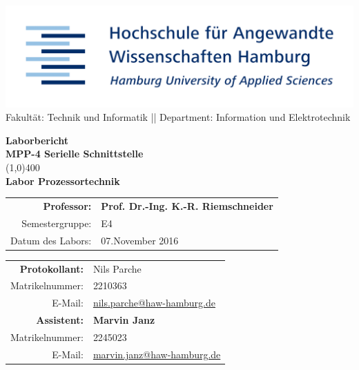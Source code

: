 	\begin{titlepage}
		\begin{flushright}
			\includegraphics[scale=0.08]{haw_logo_hd.png}\\
			{\tiny{Fakultät: Technik und Informatik || Department: Information und Elektrotechnik}}\\
			[2.5cm]
		\end{flushright}
		\begin{center}
			{\huge{\bfseries Laborbericht}}	\\
			[1.5cm]
			{\Large{\bfseries  MPP-4 Serielle Schnittstelle}}\\		
			\line(1,0){400}	\\
			[0,1cm]
			{\Large{\bfseries Labor Prozessortechnik}}	\\
			[1.5cm]
			\begin{table}[h]
				\begin{center}
					\begin{tabular}{r l}
						\small \textbf{Professor:}	&	\small \textbf{Prof. Dr.-Ing. K.-R. Riemschneider}\\[0.20cm]
						\small Semestergruppe:		&	\small E4			\\
						\small Datum des Labors:	&	\small 07.November 2016	\\
					\end{tabular}
				\end{center}
			\end{table}
			\vspace{0.5cm}
			\begin{table}[h]
				\begin{center}
					\begin{tabular}{r l}
						\small \textbf{Protokollant:}	&	\small 
						Nils Parche\\
						\small Matrikelnummer:			&	\small 2210363\\
						\small E-Mail:					&	\small 
						\href{mailto:nils.parche@haw-hamburg.de}{nils.parche@haw-hamburg.de}\\[0.30cm]
						\small \textbf{Assistent:}		&	\small 
						\textbf{Marvin Janz} \\
						\small Matrikelnummer:			&	\small 2245023\\
						\small E-Mail:					&	\small \href{mailto:marvin.janz@haw-hamburg.de}{marvin.janz@haw-hamburg.de}\\[0.30cm]


\end{tabular}
\end{center}
\end{table}
\end{center}
\end{titlepage}
